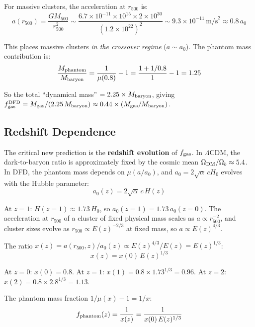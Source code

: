 \documentclass[11pt]{article}
\newcommand{\LCDM}{$\Lambda$CDM}
\begin{document}
For massive clusters, the acceleration at $r_{500}$ is:
\begin{equation}
a(r_{500}) = \frac{GM_{500}}{r_{500}^2}
\sim \frac{6.7 \times 10^{-11} \times 10^{15} \times 2 \times 10^{30}}{(1.2 \times 10^{22})^2}
\sim 9.3 \times 10^{-11}\,\text{m/s}^2 \approx 0.8\,a_0
\end{equation}

This places massive clusters \emph{in the crossover regime} ($a \sim a_0$).
The phantom mass contribution is:
\begin{equation}
\frac{M_{\rm phantom}}{M_{\rm baryon}} = \frac{1}{\mu(0.8)} - 1
= \frac{1 + 1/0.8}{1} - 1 = 1.25
\end{equation}

So the total ``dynamical mass'' $= 2.25 \times M_{\rm baryon}$, giving
$f_{\rm gas}^{\rm DFD} = M_{\rm gas}/(2.25\,M_{\rm baryon}) \approx 0.44 \times (M_{\rm gas}/M_{\rm baryon})$.

\subsection{Redshift Dependence}

The critical new prediction is the \textbf{redshift evolution} of $f_{\rm gas}$.
In \LCDM, the dark-to-baryon ratio is approximately fixed by the cosmic mean
$\Omega_{\rm DM}/\Omega_b \approx 5.4$. In DFD, the phantom mass depends on
$\mu(a/a_0)$, and $a_0 = 2\sqrt{\alpha}\,cH_0$ evolves with the Hubble parameter:
\begin{equation}
a_0(z) = 2\sqrt{\alpha}\,c\,H(z)
\end{equation}

At $z = 1$: $H(z=1) \approx 1.73\,H_0$, so $a_0(z=1) = 1.73\,a_0(z=0)$.
The acceleration at $r_{500}$ of a cluster of fixed physical mass scales as
$a \propto r_{500}^{-2}$, and cluster sizes evolve as
$r_{500} \propto E(z)^{-2/3}$ at fixed mass, so $a \propto E(z)^{4/3}$.

The ratio $x(z) = a(r_{500},z)/a_0(z) \propto E(z)^{4/3}/E(z) = E(z)^{1/3}$:
\begin{equation}
x(z) = x(0)\,E(z)^{1/3}
\end{equation}

At $z = 0$: $x(0) = 0.8$. At $z = 1$: $x(1) = 0.8 \times 1.73^{1/3} = 0.96$.
At $z = 2$: $x(2) = 0.8 \times 2.8^{1/3} = 1.13$.

The phantom mass fraction $1/\mu(x) - 1 = 1/x$:
\begin{equation}
f_{\rm phantom}(z) = \frac{1}{x(z)} = \frac{1}{x(0)\,E(z)^{1/3}}
\end{equation}
\end{document}
